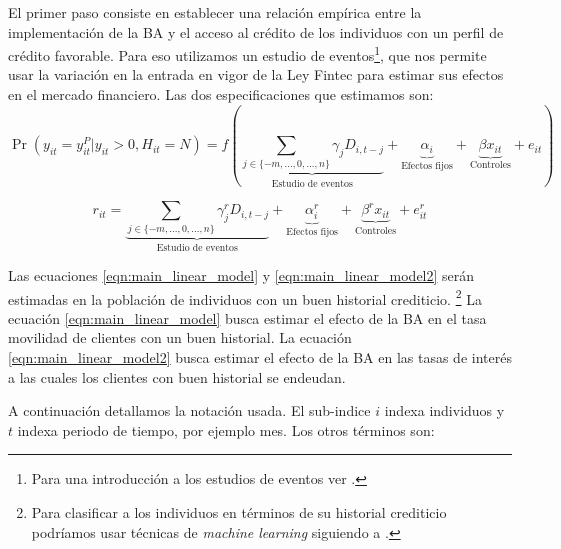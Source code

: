 \documentclass[11pt]{article}
\theoremstyle{plain}
\theoremstyle{plain}
\begin{document}
El primer paso consiste en establecer una relación empírica entre la implementación de la BA y el acceso al crédito de los individuos con un perfil de crédito favorable. Para eso utilizamos un estudio de eventos\footnote{Para una introducción a los estudios de eventos ver \textcite{miller_introductory_2023}.},  que nos permite usar la variación en la entrada en vigor de la Ley Fintec para estimar sus efectos en el mercado financiero. Las dos especificaciones que estimamos son: 
\begin{equation}
    \Pr(y_{it}=y_{it}^P|y_{it} > 0, H_{it}= N) = f\left( 
    \underbrace{\sum_{j\in \{-m,..., 0,...,n\}}\gamma_j D_{i,t-j}}_{\text{Estudio de eventos}} +
    \underbrace{\alpha_i 
    }_{\text{Efectos fijos}} +
    \underbrace{\beta x_{it}}_{\text{Controles}} + e_{it}\right) 
    \label{eqn:main_linear_model}
\end{equation}

\begin{equation}
    r_{it} = 
    \underbrace{\sum_{j\in \{-m,..., 0,...,n\}}\gamma_j^r D_{i,t-j}}_{\text{Estudio de eventos}} +
    \underbrace{\alpha_i^r 
    }_{\text{Efectos fijos}} +
    \underbrace{\beta^r x_{it}}_{\text{Controles}} + e_{it}^r 
    \label{eqn:main_linear_model2}
\end{equation}

Las ecuaciones \ref{eqn:main_linear_model} y \ref{eqn:main_linear_model2} serán estimadas en la población de individuos con un buen historial crediticio. \footnote{Para clasificar a los individuos en términos de su historial crediticio podríamos usar técnicas de \textit{machine learning} siguiendo a \textcite{liberman_equilibrium_2018}. }
La ecuación \ref{eqn:main_linear_model} busca estimar el efecto de la BA en el tasa movilidad de clientes con un buen historial. La ecuación \ref{eqn:main_linear_model2} busca estimar el efecto de la BA en las tasas de interés a las cuales los clientes con buen historial se endeudan.

A continuación detallamos la notación usada. El sub-indice $i$ indexa individuos y $t$ indexa periodo de tiempo, por ejemplo mes. Los otros términos son: 
\end{document}
